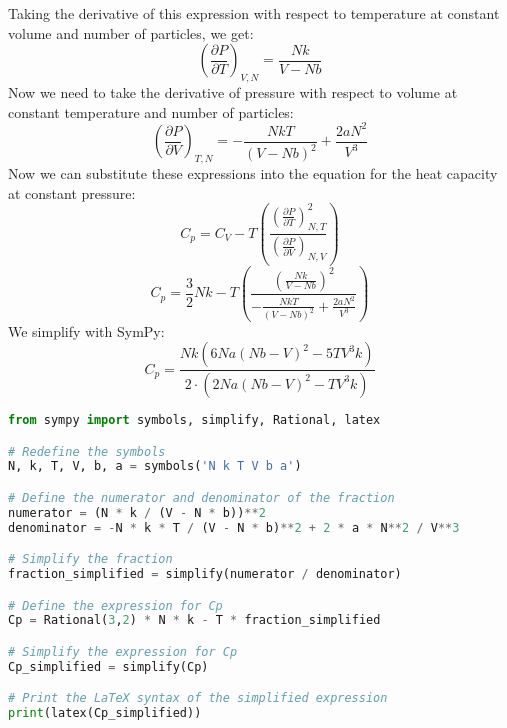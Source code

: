 \documentclass[10pt]{article}
\begin{document}
Taking the derivative of this expression with respect to temperature at constant volume and number of particles, we get:
\begin{equation}
  \left( \frac{\partial P}{\partial T} \right)_{V,N} = \frac{N k}{V-N b}
\end{equation}
Now we need to take the derivative of pressure with respect to volume at constant temperature and number of particles:
\begin{equation}
  \left( \frac{\partial P}{\partial V} \right)_{T,N} = - \frac{N k T}{\left( V-N b \right)^{2}} + \frac{2 a N^{2}}{V^{3}}
\end{equation}
Now we can substitute these expressions into the equation for the heat capacity at constant pressure:
\begin{equation}
  C_{p} = C_{V} - T \left( \frac{\left( \frac{\partial P}{\partial T} \right)_{N,T}^2}{\left( \frac{\partial P}{\partial V} \right)_{N,V}} \right)
\end{equation}
\begin{equation}
  C_{p} = \frac{3}{2}Nk - T \left( \frac{\left( \frac{N k}{V-N b} \right)^{2}}{- \frac{N k T}{\left( V-N b \right)^{2}} + \frac{2 a N^{2}}{V^{3}}} \right)
\end{equation}
We simplify with SymPy:
\begin{equation}
  C_{p} =\frac{N k \left(6 N a \left(N b - V\right)^{2} - 5 T V^{3} k\right)}{2 \cdot \left(2 N a \left(N b - V\right)^{2} - T V^{3} k\right)}
\end{equation}
\begin{lstlisting}[language=Python]
from sympy import symbols, simplify, Rational, latex

# Redefine the symbols
N, k, T, V, b, a = symbols('N k T V b a')

# Define the numerator and denominator of the fraction
numerator = (N * k / (V - N * b))**2
denominator = -N * k * T / (V - N * b)**2 + 2 * a * N**2 / V**3

# Simplify the fraction
fraction_simplified = simplify(numerator / denominator)

# Define the expression for Cp
Cp = Rational(3,2) * N * k - T * fraction_simplified

# Simplify the expression for Cp
Cp_simplified = simplify(Cp)

# Print the LaTeX syntax of the simplified expression
print(latex(Cp_simplified))

\end{lstlisting}
\end{document}

